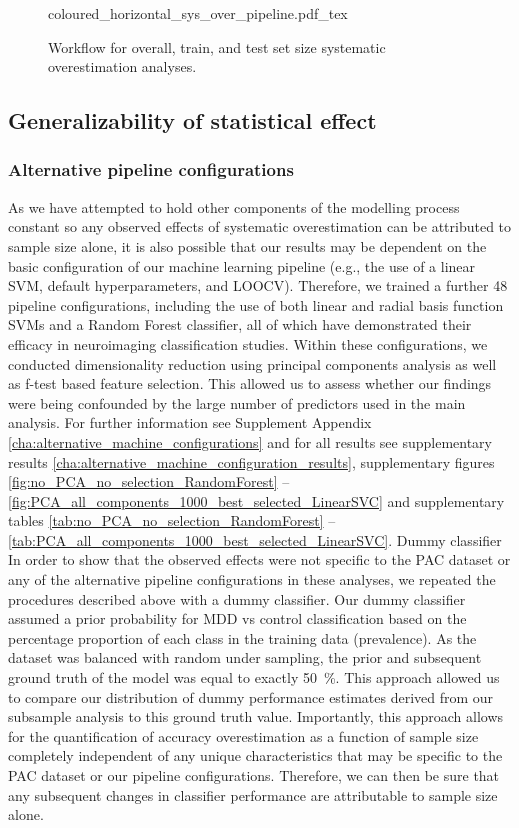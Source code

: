 \documentclass{article}
\begin{document}
    \begin{figure}
        \def\svgwidth{\textwidth}
        {coloured_horizontal_sys_over_pipeline.pdf_tex}
        \caption{Workflow for overall, train, and test set size systematic overestimation analyses.}
        \label{fig:pipeline}
    \end{figure}

    \subsection{Generalizability of statistical effect}
    \subsubsection{Alternative pipeline configurations}
    As we have attempted to hold other components of the modelling process constant so any observed effects of systematic overestimation can be attributed to sample size alone, it is also possible that our results may be dependent on the basic configuration of our machine learning pipeline (e.g., the use of a linear SVM, default hyperparameters, and LOOCV). Therefore, we trained a further \num{48} pipeline configurations, including the use of both linear and radial basis function SVMs and a Random Forest classifier, all of which have demonstrated their efficacy in neuroimaging classification studies.\cite{Kambeitz2017} Within these configurations, we conducted dimensionality reduction using principal components analysis as well as f-test based feature selection. This allowed us to assess whether our findings were being confounded by the large number of predictors used in the main analysis. For further information see Supplement Appendix \ref{cha:alternative_machine_configurations} and for all results see supplementary results \ref{cha:alternative_machine_configuration_results}, supplementary figures \ref{fig:no_PCA_no_selection_RandomForest} – \ref{fig:PCA_all_components_1000_best_selected_LinearSVC} and supplementary tables \ref{tab:no_PCA_no_selection_RandomForest} – \ref{tab:PCA_all_components_1000_best_selected_LinearSVC}.
    Dummy classifier
    In order to show that the observed effects were not specific to the PAC dataset or any of the alternative pipeline configurations in these analyses, we repeated the procedures described above with a dummy classifier. Our dummy classifier assumed a prior probability for MDD vs control classification based on the percentage proportion of each class in the training data (prevalence). As the dataset was balanced with random under sampling, the prior and subsequent ground truth of the model was equal to exactly \SI{50}{\percent}. This approach allowed us to compare our distribution of dummy performance estimates derived from our subsample analysis to this ground truth value. Importantly, this approach allows for the quantification of accuracy overestimation as a function of sample size completely independent of any unique characteristics that may be specific to the PAC dataset or our pipeline configurations. Therefore, we can then be sure that any subsequent changes in classifier performance are attributable to sample size alone.
\end{document}
